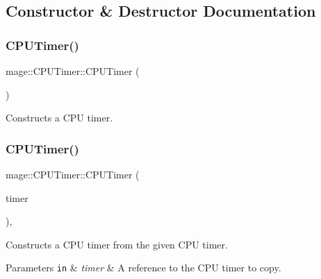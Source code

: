 \subsection{Constructor \& Destructor Documentation}
\hypertarget{classmage_1_1_c_p_u_timer_a398b1d5c99bcb09fbe37b2d74547b3e0}{}\label{classmage_1_1_c_p_u_timer_a398b1d5c99bcb09fbe37b2d74547b3e0} 
\subsubsection{\texorpdfstring{C\+P\+U\+Timer()}{CPUTimer()}\hspace{0.1cm}{\footnotesize\ttfamily [1/3]}}
{\footnotesize\ttfamily mage\+::\+C\+P\+U\+Timer\+::\+C\+P\+U\+Timer (\begin{DoxyParamCaption}{ }\end{DoxyParamCaption})}

Constructs a C\+PU timer. \hypertarget{classmage_1_1_c_p_u_timer_a23afe7d7b5d85ecf1275f750a935e7c3}{}\label{classmage_1_1_c_p_u_timer_a23afe7d7b5d85ecf1275f750a935e7c3} 
\subsubsection{\texorpdfstring{C\+P\+U\+Timer()}{CPUTimer()}\hspace{0.1cm}{\footnotesize\ttfamily [2/3]}}
{\footnotesize\ttfamily mage\+::\+C\+P\+U\+Timer\+::\+C\+P\+U\+Timer (\begin{DoxyParamCaption}\item[{const \hyperlink{classmage_1_1_c_p_u_timer}{C\+P\+U\+Timer} \&}]{timer }\end{DoxyParamCaption})\hspace{0.3cm}{\ttfamily [default]}, {\ttfamily [noexcept]}}

Constructs a C\+PU timer from the given C\+PU timer.


\begin{DoxyParams}[1]{Parameters}
\mbox{\tt in}  & {\em timer} & A reference to the C\+PU timer to copy. \\
\hline
\end{DoxyParams}
\hypertarget{classmage_1_1_c_p_u_timer_a7915bc9952e7607ffbe93f18dd1cb0b4}{}\label{classmage_1_1_c_p_u_timer_a7915bc9952e7607ffbe93f18dd1cb0b4} 
